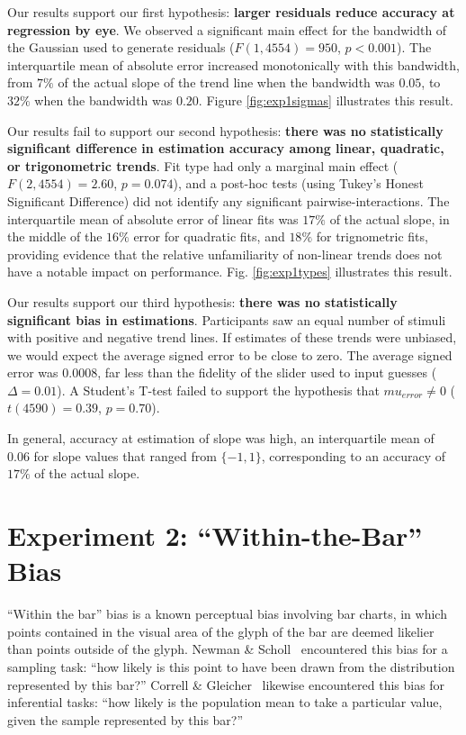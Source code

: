 \documentclass{sigchi}
\begin{document}
Our results support our first hypothesis: \textbf{larger residuals reduce accuracy at regression by eye}.  We observed a significant main effect for the bandwidth of the Gaussian used to generate residuals ($F(1,4554)=950$, $p<0.001$). The interquartile mean of absolute error increased monotonically with this bandwidth, from $7\%$ of the actual slope of the trend line when the bandwidth was $0.05$, to $32\%$ when the bandwidth was $0.20$. Figure \ref{fig:exp1sigmas} illustrates this result.

Our results fail to support our second hypothesis: \textbf{there was no statistically significant difference in estimation accuracy among linear, quadratic, or trigonometric trends}. Fit type had only a marginal main effect ($F(2,4554)=2.60$, $p=0.074$), and a post-hoc tests (using Tukey's Honest Significant Difference) did not identify any significant pairwise-interactions. The interquartile mean of absolute  error of linear fits was $17\%$ of the actual slope, in the middle of the $16\%$ error for quadratic fits, and $18\%$ for trignometric fits, providing evidence that the relative unfamiliarity of non-linear trends does not have a notable impact on performance. Fig. \ref{fig:exp1types} illustrates this result.

Our results support our third hypothesis: \textbf{there was no statistically significant bias in estimations}. Participants saw an equal number of stimuli with positive and negative trend lines. If estimates of these trends were unbiased, we would expect the average signed error to be close to zero. The average signed error was $0.0008$, far less than the fidelity of the slider used to input guesses ($\Delta=0.01$). A Student's T-test failed to support the hypothesis that $mu_{error}\ne0$ ($t(4590) = 0.39$, $p=0.70$).

In general, accuracy at estimation of slope was high, an interquartile mean of $0.06$ for slope values that ranged from $\{-1,1\}$, corresponding to an accuracy of $17\%$ of the actual slope.

\section{Experiment 2: ``Within-the-Bar'' Bias}

\expTwoTypesFig

``Within the bar'' bias is a known perceptual bias involving bar charts, in which points contained in the visual area of the glyph of the bar are deemed likelier than points outside of the glyph. Newman \& Scholl~\cite{newman2012bar} encountered this bias for a sampling task: ``how likely is this point to have been drawn from the distribution represented by this bar?'' Correll \& Gleicher~\cite{correll2014error} likewise encountered this bias for inferential tasks: ``how likely is the population mean to take a particular value, given the sample represented by this bar?''
\end{document}
